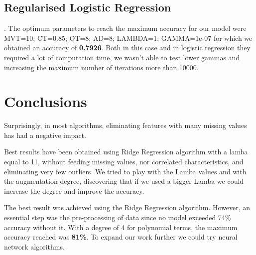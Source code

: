 \documentclass[10pt,conference,compsocconf]{IEEEtran}
\begin{document}
\subsection{Regularised Logistic Regression}.
The optimum parameters to reach the maximum accuracy for our model were MVT=10; CT=0.85; OT=8; AD=8; LAMBDA=1; GAMMA=1e-07 for which we obtained an accuracy of \textbf{0.7926}. Both in this case and in logistic regression they required a lot of computation time, we wasn't able to test lower gammas and increasing the maximum number of iterations more than 10000.

\section{Conclusions}
Surprisingly, in most algorithms, eliminating features with many missing values has had a negative impact. 

Best results have been obtained using Ridge Regression algorithm with a lamba equal to 11, without feeding missing values, nor correlated characteristics, and eliminating very few outliers. We tried to play with the Lamba values and with the augmentation degree, discovering that if we used a bigger Lamba we could increase the degree and improve the accuracy.


The best result was achieved using the Ridge Regression algorithm. However, an essential step was the pre-processing of data since no model exceeded 74\% accuracy without it. With a degree of 4 for polynomial terms, the maximum accuracy reached was \textbf{81\%}. To expand our work further we could try neural network algorithms.
\end{document}
